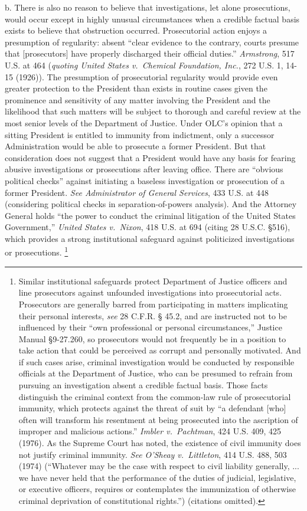 b. There is also no reason to believe that investigations, let alone prosecutions, would occur except in highly unusual circumstances when a credible factual basis exists to believe that obstruction occurred.
Prosecutorial action enjoys a presumption of regularity: absent “clear evidence to the contrary, courts presume that [prosecutors] have properly discharged their official duties.”
\textit{Armstrong}, 517 U.S. at 464 (\textit{quoting United States v.\ Chemical Foundation, Inc.}, 272 U.S. 1, 14-15 (1926)).
The presumption of prosecutorial regularity would provide even greater protection to the President than exists in routine cases given the prominence and sensitivity of any matter involving the President and the likelihood that such matters will be subject to thorough and careful review at the most senior levels of the Department of Justice.
Under OLC’s opinion that a sitting President is entitled to immunity from indictment, only a successor Administration would be able to prosecute a former President.
But that consideration does not suggest that a President would have any basis for fearing abusive investigations or prosecutions after leaving office.
There are “obvious political checks” against initiating a baseless investigation or prosecution of a former President.
\textit{See Administrator of General Services}, 433 U.S. at 448 (considering political checks in separation-of-powers analysis).
And the Attorney General holds “the power to conduct the criminal litigation of the United States Government,” \textit{United States v.\ Nixon}, 418 U.S. at 694 (citing 28 U.S.C. \S 516), which provides a strong institutional safeguard against politicized investigations or prosecutions.%
\footnote{Similar institutional safeguards protect Department of Justice officers and line prosecutors against unfounded investigations into prosecutorial acts.
Prosecutors are generally barred from participating in matters implicating their personal interests, \textit{see} 28 C.F.R. § 45.2, and are instructed not to be influenced by their “own professional or personal circumstances,” Justice Manual \S 9-27.260, so prosecutors would not frequently be in a position to take action that could be perceived as corrupt and personally motivated.
And if such cases arise, criminal investigation would be conducted by responsible officials at the Department of Justice, who can be presumed to refrain from pursuing an investigation absent a credible factual basis.
Those facts distinguish the criminal context from the common-law rule of prosecutorial immunity, which protects against the threat of suit by “a defendant [who] often will transform his resentment at being prosecuted into the ascription of improper and malicious actions.”
\textit{Imbler v.\ Pachtman}, 424 U.S. 409, 425 (1976).
As the Supreme Court has noted, the existence of civil immunity does not justify criminal immunity.
\textit{See O'Sheay v.\ Littleton}, 414 U.S. 488, 503 (1974) (“Whatever may be the case with respect to civil liability generally, ... we have never held that the performance of the duties of judicial, legislative, or executive officers, requires or contemplates the immunization of otherwise criminal deprivation of constitutional rights.”) (citations omitted).}

